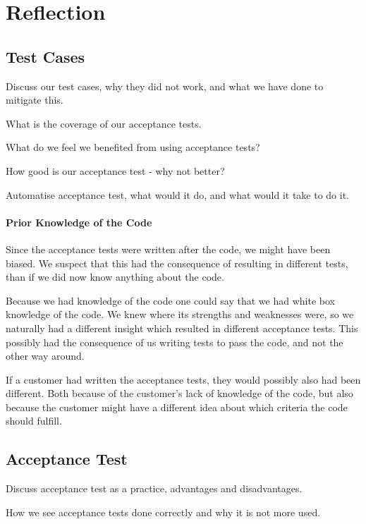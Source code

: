 \section{Reflection}
\subsection{Test Cases}
Discuss our test cases, why they did not work, and what we have done to mitigate this.

What is the coverage of our acceptance tests.

What do we feel we benefited from using acceptance tests?

How good is our acceptance test - why not better?

Automatise acceptance test, what would it do, and what would it take to do it.

\paragraph{Prior Knowledge of the Code}
Since the acceptance tests were written after the code, we might have been biased. We suspect that this had the consequence of resulting in different tests, than if we did now know anything about the code. 

Because we had knowledge of the code one could say that we had white box knowledge of the code. We knew where its strengths and weaknesses were, so we naturally had a different insight which resulted in different acceptance tests.
This possibly had the consequence of us writing tests to pass the code, and not the other way around. 

If a customer had written the acceptance tests, they would possibly also had been different. Both because of the customer's lack of knowledge of the code, but also because the customer might have a different idea about which criteria the code should fulfill.


\subsection{Acceptance Test}
Discuss acceptance test as a practice, advantages and disadvantages.

How we see acceptance tests done correctly and why it is not more used.
